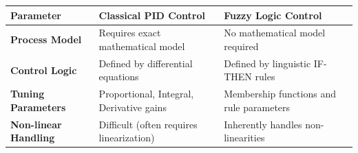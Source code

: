 \documentclass[12pt,a4paper]{article}
\renewcommand{\arraystretch}{1.45}
\begin{document}
\begin{tcolorbox}[tikzbox, title={Comparison of Control Strategies}]
\centering
{\renewcommand{\arraystretch}{1.55}%
\begin{tabularx}{\linewidth}{|>{\bfseries}B{3.2cm}|Y|Y|}
\hline
Parameter & Classical PID Control & Fuzzy Logic Control \\
\hline
Process Model & Requires exact mathematical model & No mathematical model required \\
\hline
Control Logic & Defined by differential equations & Defined by linguistic IF-THEN rules \\
\hline
Tuning Parameters & Proportional, Integral, Derivative gains & Membership functions and rule parameters \\[4pt]
\hline
Non-linear Handling & Difficult (often requires linearization) & Inherently handles non-linearities \\[4pt]
\hline
\end{tabularx}}
\end{tcolorbox}
\end{document}

